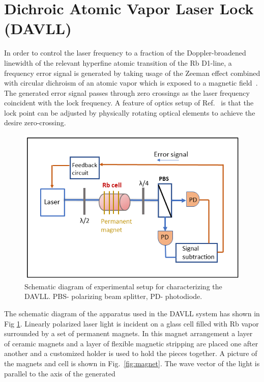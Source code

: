 \section{Dichroic Atomic Vapor Laser Lock (DAVLL)}

In order to control the laser frequency to a fraction of the
Doppler-broadened linewidth of the relevant hyperfine atomic
transition of the Rb D1-line, a frequency error signal is generated by
taking usage of the Zeeman effect combined with circular dichroism of
an atomic vapor which is exposed to a magnetic
field~\cite{doi:10.1063/1.3568824}. The generated error signal passes
through zero crossings as the laser frequency coincident with the lock
frequency.  A feature of optics setup of
Ref.~\cite{doi:10.1063/1.3568824} is that the lock point can be
adjusted by physically rotating optical elements to achieve the desire
zero-crossing.
\begin{figure}%
\centering
\includegraphics[width=0.8\linewidth]{figures/DAVLL}
\caption{Schematic diagram of experimental setup for characterizing the DAVLL. PBS- polarizing beam splitter, PD- photodiode.\label{fig:DAVLL}}
\end{figure}
The schematic diagram of the apparatus used in the DAVLL system has
shown in Fig \ref{fig:DAVLL}. Linearly polarized laser light is
incident on a glass cell filled with Rb vapor surrounded by a set of
permanent magnets. In this magnet arrangement a layer of ceramic
magnets and a layer of flexible magnetic stripping are placed one
after another and a customized holder is used to hold the pieces
together.  A picture of the magnets and cell is shown in
Fig.~\ref{fig:magnet}.
The wave vector of the light is parallel to the axis of the generated
